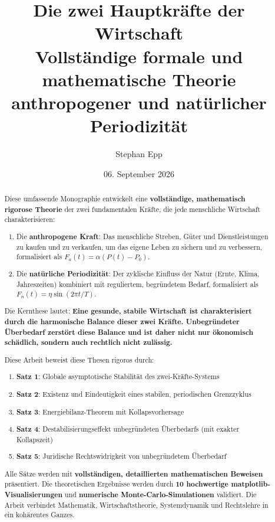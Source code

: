 \documentclass[a4paper,11pt]{report}
\title{\textbf{\huge Die zwei Hauptkräfte der Wirtschaft}\\
\vspace{1cm}
\Large Vollständige formale und mathematische Theorie\\
anthropogener und natürlicher Periodizität}
\author{Stephan Epp}
\date{06. September 2026}
\theoremstyle{definition}
\begin{document}
\maketitle

\begin{abstract}
Diese umfassende Monographie entwickelt eine \textbf{vollständige, mathematisch rigorose Theorie} der zwei fundamentalen Kräfte, die jede menschliche Wirtschaft charakterisieren:

\begin{enumerate}
    \item Die \textbf{anthropogene Kraft}: Das menschliche Streben, Güter und Dienstleistungen zu kaufen und zu verkaufen, um das eigene Leben zu sichern und zu verbessern, formalisiert als $F_a(t) = \alpha(P(t) - P_0)$.
    \item Die \textbf{natürliche Periodizität}: Der zyklische Einfluss der Natur (Ernte, Klima, Jahreszeiten) kombiniert mit reguliertem, begründetem Bedarf, formalisiert als $F_n(t) = \eta \sin(2\pi t/T)$.
\end{enumerate}

Die Kernthese lautet: \textbf{Eine gesunde, stabile Wirtschaft ist charakterisiert durch die harmonische Balance dieser zwei Kräfte. Unbegründeter Überbedarf zerstört diese Balance und ist daher nicht nur ökonomisch schädlich, sondern auch rechtlich nicht zulässig.}

Diese Arbeit beweist diese Thesen rigoros durch:

\begin{enumerate}
    \item \textbf{Satz 1}: Globale asymptotische Stabilität des zwei-Kräfte-Systems
    \item \textbf{Satz 2}: Existenz und Eindeutigkeit eines stabilen, periodischen Grenzzyklus
    \item \textbf{Satz 3}: Energiebilanz-Theorem mit Kollapsvorhersage
    \item \textbf{Satz 4}: Destabilisierungseffekt unbegründeten Überbedarfs (mit exakter Kollapszeit)
    \item \textbf{Satz 5}: Juridische Rechtswidrigkeit von unbegründetem Überbedarf
\end{enumerate}

Alle Sätze werden mit \textbf{vollständigen, detaillierten mathematischen Beweisen} präsentiert. Die theoretischen Ergebnisse werden durch \textbf{10 hochwertige matplotlib-Visualisierungen} und \textbf{numerische Monte-Carlo-Simulationen} validiert. Die Arbeit verbindet Mathematik, Wirtschaftstheorie, Systemdynamik und Rechtslehre in ein kohärentes Ganzes.
\end{abstract}
\end{document}
